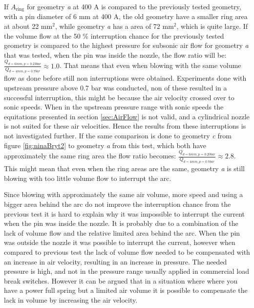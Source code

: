 \documentclass[10pt,a4paper,twoside]{article}
\begin{document}
If $A_\mathrm{{ring}}$ for geometry \textit{a} at 400 A is compared to the previously tested geometry, with a pin diameter of 6 mm at 400 A, the old geometry have a smaller ring area at about 22 $\mathrm{{mm^2}}$, while geometry \textit{a} has a area of 72 $\mathrm{{mm^2}}$, which is quite large. If the volume flow at the 50 \% interruption chance for the previously tested geometry is compared to the highest pressure for subsonic air flow for geometry \textit{a} that was tested, when the pin was inside the nozzle, the flow ratio will be: $\frac{Q_{d=6 mm, p=0.23 bar}}{Q_{d=4 mm, p=0.7 bar}}\approx 1.0$. That means that even when blowing with the same volume flow as done before still non interruptions were obtained. Experiments done with upstream pressure above 0.7 bar was conducted, non of these resulted in a successful interruption, this might be because the air velocity crossed over to sonic speeds. When in the upstream pressure range with sonic speeds the equitations presented in section \ref{sec:AirFlow} is not valid, and a cylindrical nozzle is not suited for these air velocities. Hence the results from these interruptions is not investigated further. If the same comparison is done to geometry \textit{c} from figure \ref{fig:ninaBryt2} to geometry \textit{a} from this test, which both have approximately the same ring area the flow ratio becomes: $\frac{Q_{d=6 mm, p=0.20 bar}}{Q_{d=4 mm, p=0.7 bar}}\approx 2.8$. This might mean that even when the ring areas are the same, geometry \textit{a} is still blowing with too little volume flow to interrupt the arc.

Since blowing with approximately the same air volume, more speed and using a bigger area behind the arc do not improve the interruption chance from the previous test it is hard to explain why it was impossible to interrupt the current when the pin was inside the nozzle. It is probably due to a combination of the lack of volume flow and the relative limited area behind the arc. When the pin was outside the nozzle it was possible to interrupt the current, however when compared to previous test the lack of volume flow needed to be compensated with an increase in air velocity, resulting in an increase in pressure. The needed pressure is high, and not in the pressure range usually applied in commercial load break switches. However it can be argued that in a situation where where you have a power full spring but a limited air volume it is possible to compensate the lack in volume by increasing the air velocity.
\end{document}
